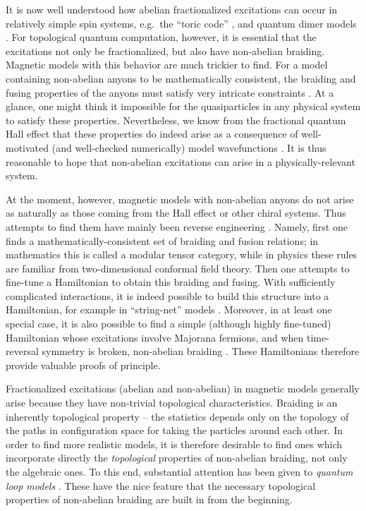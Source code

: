 \documentclass[11pt]{article}
\begin{document}
It is now
well understood how abelian fractionalized excitations can occur in
relatively simple spin systems, e.g.\ the ``toric code''
\cite{Kitaev97}, and quantum dimer models \cite{MS}. 
For topological quantum computation, however, it is essential that the
excitations not only be fractionalized, but also have non-abelian
braiding.  Magnetic models with this behavior are much trickier to
find. For a model containing non-abelian anyons to be mathematically
consistent, the braiding and fusing properties of the anyons must
satisfy very intricate constraints \cite{DFNSS,Preskill}. At a glance, one
might think it impossible for the quasiparticles in any
physical system to satisfy these properties. Nevertheless, we know
from the fractional quantum Hall effect that these properties do
indeed arise as a
consequence of well-motivated (and well-checked numerically) model
wavefunctions \cite{MR}. It is thus reasonable to hope that non-abelian
excitations can arise in a physically-relevant system.

At the moment, however, magnetic models with non-abelian anyons do not
arise as naturally as those coming from the Hall effect or other
chiral systems. Thus attempts to find them have mainly been reverse
engineering \cite{Freedman01}. Namely, first one finds a
mathematically-consistent set of braiding and fusion relations; in
mathematics this is called a modular tensor category, while in physics
these rules are familiar from two-dimensional conformal field
theory. Then one attempts to fine-tune a Hamiltonian to obtain this
braiding and fusing. With sufficiently complicated interactions, it is
indeed possible to build this structure into a Hamiltonian, for
example in ``string-net'' models \cite{LevinWen}. Moreover, in at
least one special case, it is also possible to find a simple (although
highly fine-tuned) Hamiltonian whose excitations involve Majorana
fermions, and when time-reversal symmetry is broken, non-abelian
braiding \cite{Kitaev2}. These Hamiltonians therefore provide valuable
proofs of principle.

Fractionalized excitations (abelian and non-abelian) in magnetic
models generally arise because they have non-trivial topological
characteristics. Braiding is an inherently topological property --
the statistics depends only on the topology of the paths in
configuration space for taking the particles around each other.  In
order to find more realistic models, it is therefore desirable to find
ones which incorporate directly the {\em topological} properties of
non-abelian braiding, not only the algebraic ones. To this end,
substantial attention has been given to {\em quantum loop models}
\cite{Freedman01}. These have the nice feature that the necessary
topological properties of non-abelian braiding are built in from the
beginning.
\end{document}
